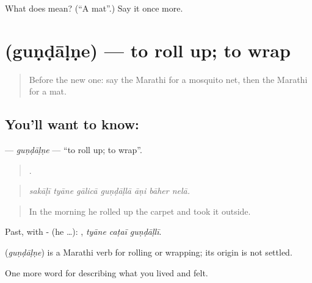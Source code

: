 \begin{tcolorbox}[breakable,colback=teal!4,colframe=teal!35!black,title={Before you move on}]
What does  mean? (\textquotedblleft{}A mat\textquotedblright{}.) Say it once more.
\end{tcolorbox}
\section[\texorpdfstring{\mr{गुंडाळणे} (guṇḍāḷṇe)}{गुंडाळणे (guṇḍāḷṇe)}]{ (guṇḍāḷṇe) — to roll up; to wrap}

\label{lesson:MR-C523-gundalne}



\begin{quote}
Before the new one: say the Marathi for a mosquito net, then the Marathi for a mat.
\end{quote}

\subsection*{You'll want to know: }
\textbf{} — \emph{guṇḍāḷṇe} — \textquotedblleft{}to roll up; to wrap\textquotedblright{}.

\begin{quote}
      .
\end{quote}

\begin{quote}
\emph{sakāḷī tyāne gālicā guṇḍāḷlā āṇi bāher nelā.}
\end{quote}

\begin{quote}
In the morning he rolled up the carpet and took it outside.
\end{quote}

Past, with - (he …):   , \emph{tyāne caṭaī guṇḍāḷlī}.

\begin{cousinweb}
\textbf{} (\emph{guṇḍāḷṇe}) is a Marathi verb for rolling or wrapping; its origin is not settled.
\end{cousinweb}

\begin{grammarlens}[title={What you've built}]
One more word for describing what you lived and felt.
\end{grammarlens}

